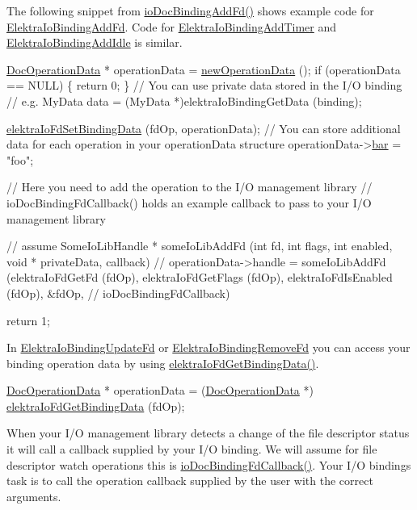 The following snippet from \hyperlink{io__doc_8c_ae9b5f4e891829f3af8563e8160e1bd02}{io\+Doc\+Binding\+Add\+Fd()} shows example code for \hyperlink{kdbio_8h_addbfc876a15d0b8864196c67ab3e5a26}{Elektra\+Io\+Binding\+Add\+Fd}. Code for \hyperlink{kdbio_8h_a61a8f37e371b8360c92222f58f4691eb}{Elektra\+Io\+Binding\+Add\+Timer} and \hyperlink{kdbio_8h_adcfdf9f514441cabfbfd064fe4021522}{Elektra\+Io\+Binding\+Add\+Idle} is similar.


\begin{DoxyCodeInclude}
        \hyperlink{structDocOperationData}{DocOperationData} * operationData = \hyperlink{io__doc_8c_a18494b019c975b4212d39c9d83ff1e02}{newOperationData} ();
        \textcolor{keywordflow}{if} (operationData == NULL)
        \{
                \textcolor{keywordflow}{return} 0;
        \}
        \textcolor{comment}{// You can use private data stored in the I/O binding}
        \textcolor{comment}{// e.g. MyData data = (MyData *)elektraIoBindingGetData (binding);}

        \hyperlink{io_8c_ae02ec122aafa67b7dd92d9c3daa6499e}{elektraIoFdSetBindingData} (fdOp, operationData);
        \textcolor{comment}{// You can store additional data for each operation in your operationData structure}
        operationData->\hyperlink{structDocOperationData_aae15fddcc4a8c6e7a9faaebe4f9964ec}{bar} = \textcolor{stringliteral}{"foo"};

        \textcolor{comment}{// Here you need to add the operation to the I/O management library}
        \textcolor{comment}{// ioDocBindingFdCallback() holds an example callback to pass to your I/O management library}

        \textcolor{comment}{// assume SomeIoLibHandle * someIoLibAddFd (int fd, int flags, int enabled, void * privateData,
       callback)}
        \textcolor{comment}{// operationData->handle = someIoLibAddFd (elektraIoFdGetFd (fdOp), elektraIoFdGetFlags (fdOp),
       elektraIoFdIsEnabled (fdOp), &fdOp,}
        \textcolor{comment}{// ioDocBindingFdCallback)}

        \textcolor{keywordflow}{return} 1;
\end{DoxyCodeInclude}
 In \hyperlink{kdbio_8h_acdb75b8df54c2b64980cf541b2704f37}{Elektra\+Io\+Binding\+Update\+Fd} or \hyperlink{kdbio_8h_af1d03ff367130892ec3d1f4788eb8277}{Elektra\+Io\+Binding\+Remove\+Fd} you can access your binding operation data by using \hyperlink{io_8c_a6103b457ed1440d0490acf0a6ec17386}{elektra\+Io\+Fd\+Get\+Binding\+Data()}.


\begin{DoxyCodeInclude}
        \hyperlink{structDocOperationData}{DocOperationData} * operationData = (\hyperlink{structDocOperationData}{DocOperationData} *)
      \hyperlink{io_8c_a6103b457ed1440d0490acf0a6ec17386}{elektraIoFdGetBindingData} (fdOp);
\end{DoxyCodeInclude}
 When your I/O management library detects a change of the file descriptor status it will call a callback supplied by your I/O binding. We will assume for file descriptor watch operations this is \hyperlink{io__doc_8c_a1fce91400d38bed917cdb6dfc1bc1cf6}{io\+Doc\+Binding\+Fd\+Callback()}. Your I/O binding\textquotesingle{}s task is to call the operation callback supplied by the user with the correct arguments.


